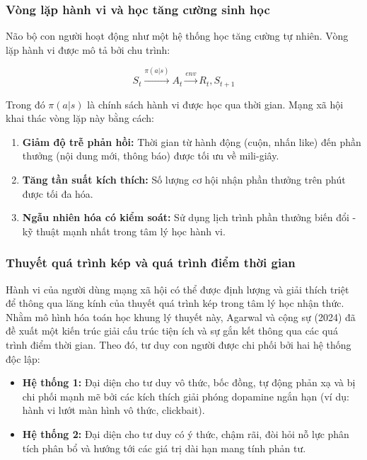 \subsubsection{Vòng lặp hành vi và học tăng cường sinh học}

Não bộ con người hoạt động như một hệ thống học tăng cường tự nhiên. Vòng lặp hành vi được mô tả bởi chu trình:

\begin{equation}
    S_t \xrightarrow{\pi(a|s)} A_t \xrightarrow{env} R_t, S_{t+1}
\end{equation}

Trong đó $\pi(a|s)$ là chính sách hành vi được học qua thời gian. Mạng xã hội khai thác vòng lặp này bằng cách:

\begin{enumerate}
    \item \textbf{Giảm độ trễ phản hồi:} Thời gian từ hành động (cuộn, nhấn like) đến phần thưởng (nội dung mới, thông báo) được tối ưu về mili-giây.
    \item \textbf{Tăng tần suất kích thích:} Số lượng cơ hội nhận phần thưởng trên phút được tối đa hóa.
    \item \textbf{Ngẫu nhiên hóa có kiểm soát:} Sử dụng lịch trình phần thưởng biến đổi - kỹ thuật mạnh nhất trong tâm lý học hành vi.
\end{enumerate}

\subsubsection{Thuyết quá trình kép và quá trình điểm thời gian}

Hành vi của người dùng mạng xã hội có thể được định lượng và giải thích triệt để thông qua lăng kính của thuyết quá trình kép trong tâm lý học nhận thức. Nhằm mô hình hóa toán học khung lý thuyết này, Agarwal và cộng sự (2024) \cite{agarwal2024_system2} đã đề xuất một kiến trúc giải cấu trúc tiện ích và sự gắn kết thông qua các quá trình điểm thời gian. Theo đó, tư duy con người được chi phối bởi hai hệ thống độc lập:
\begin{itemize}
    \item \textbf{Hệ thống 1:} Đại diện cho tư duy vô thức, bốc đồng, tự động phản xạ và bị chi phối mạnh mẽ bởi các kích thích giải phóng dopamine ngắn hạn (ví dụ: hành vi lướt màn hình vô thức, clickbait).
    \item \textbf{Hệ thống 2:} Đại diện cho tư duy có ý thức, chậm rãi, đòi hỏi nỗ lực phân tích phân bổ và hướng tới các giá trị dài hạn mang tính phản tư.
\end{itemize}

